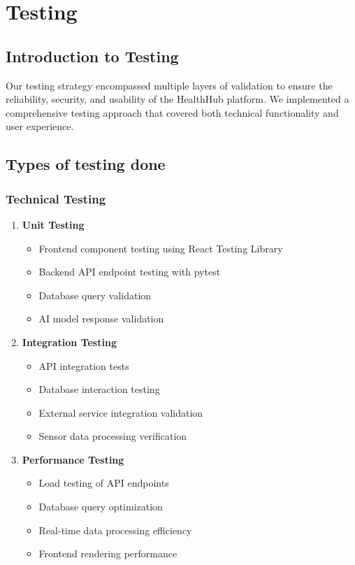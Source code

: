\pagestyle{fancy}
\thispagestyle{fancy}
\chapter{Testing}
\section{Introduction to Testing}
Our testing strategy encompassed multiple layers of validation to ensure the reliability, security, and usability of the HealthHub platform. We implemented a comprehensive testing approach that covered both technical functionality and user experience.

\section{Types of testing done}
\subsection{Technical Testing}

\begin{enumerate}
    \item \textbf{Unit Testing}
    \begin{itemize}
        \item Frontend component testing using React Testing Library
        \item Backend API endpoint testing with pytest
        \item Database query validation
        \item AI model response validation
    \end{itemize}

    \item \textbf{Integration Testing}
    \begin{itemize}
        \item API integration tests
        \item Database interaction testing
        \item External service integration validation
        \item Sensor data processing verification
    \end{itemize}

    \item \textbf{Performance Testing}
    \begin{itemize}
        \item Load testing of API endpoints
        \item Database query optimization
        \item Real-time data processing efficiency
        \item Frontend rendering performance
    \end{itemize}
\end{enumerate}

